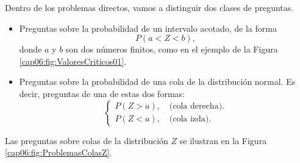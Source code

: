 Dentro de los problemas directos, vamos a distinguir dos clases de preguntas.
\begin{itemize}
  \item Preguntas sobre la probabilidad de un {\sf intervalo acotado}, de la
      forma
  \[P(a<Z<b),\]
  donde $a$ y $b$ son dos números finitos, como en el ejemplo de la Figura
  \ref{cap06:fig:ValoresCriticos01}.
  \item Preguntas sobre la probabilidad de una {\sf cola} de la distribución
      normal. Es decir, preguntas de una de estas dos formas:
      \[
      \begin{cases}
      P(Z>a),\quad \mbox{(cola derecha).}\\[3mm]
      P(Z<a),\quad \mbox{(cola izda).}
      \end{cases}
      \]
\end{itemize}
Las preguntas sobre colas de la distribución $Z$ se ilustran en la Figura
\ref{cap06:fig:ProblemasColasZ}.

